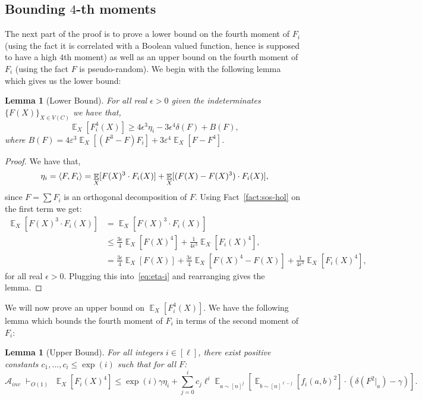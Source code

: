 \documentclass[11pt]{article}
\DeclareMathOperator*{\E}{\mathbb{E}}
\DeclarePairedDelimiter\ip{\langle}{\rangle}
\def \cA {\mathcal{A}}
\def \eps {{\varepsilon}}
\newtheorem{lemma}[theorem]{Lemma}
\theoremstyle{definition}
\begin{document}
\subsection{Bounding $4$-th moments}
The next part of the proof is to prove a lower 
bound on the fourth moment of $F_i$ (using the fact
it is correlated with a Boolean valued function, 
hence is supposed to have a high $4$th moment) 
as well as an upper bound on the fourth moment of 
$F_i$ (using the fact $F$ is pseudo-random). We 
begin with the following lemma which gives us the lower bound:
\begin{lemma}[Lower Bound]\label{lem:lower-bound}
For all real $\epsilon > 0$ given the indeterminates $\{F(X)\}_{X \in V(C)}$ we have that,
$$\E_X[F_i^4(X)] \geq 4\epsilon^3 \eta_i - 3\epsilon^4\delta(F) + B(F),$$
where $B(F) = 4\eps^3\E_X[(F^{ 3} - F)F_i]+3\eps^4 \E_X[F - F^{ 4}]$.
\end{lemma}

\begin{proof}
We have that, 
\begin{align}\label{eq:eta-i}
\eta_i = \ip{F,F_i} = \E_X[F(X)^3 \cdot F_i(X)] + \E_X[(F(X) - F(X)^3) \cdot F_i(X)],
\end{align}
since $F = \sum F_i$ is an orthogonal decomposition of $F$. Using Fact~\ref{fact:sos-hol} on the first term we get:
\begin{align*}
\E_X[F(X)^3 \cdot F_i(X)] &= 
\E_X[F(X)^3 \cdot F_i(X)]\\
&\leq  
\frac{3\epsilon}{4}\E_X[F(X)^4] + \frac{1}{4\epsilon^3}\E_X[F_i(X)^4],\\
&= \frac{3\epsilon}{4}\E_X[F(X)] +\frac{3\epsilon}{4}\E_X[F(X)^4 - F(X)] +  \frac{1}{4\epsilon^3}\E_X[F_i(X)^4],
\end{align*}
for all real $\epsilon > 0$. Plugging this into~\eqref{eq:eta-i} and rearranging gives the lemma.
\end{proof}


We will now prove an upper bound on $\E_X[F_i^4(X)]$. We have the following lemma which bounds the fourth moment of $F_i$ in terms of the second moment of $F_i$:



\begin{lemma}[Upper Bound]\label{lem:upper-bound}
For all integers $i \in [\ell]$, there exist positive constants $c_1, \ldots, c_i \leq \exp(i)$ such that for all $F$:
\[\cA_{inv} \,\, \vdash_{O(1)}\,\, \E_X[F_i(X)^4] \leq \exp(i)\gamma \eta_i + \sum_{j = 0}^i c_j \ell^{i}\E_{a \sim [n]^{j}}[\E_{b \sim [n]^{\ell-j}}[f_i(a,b)^2]\cdot (\delta(F^{ 2}|_a) - \gamma)].\] 
\end{lemma}
\end{document}
